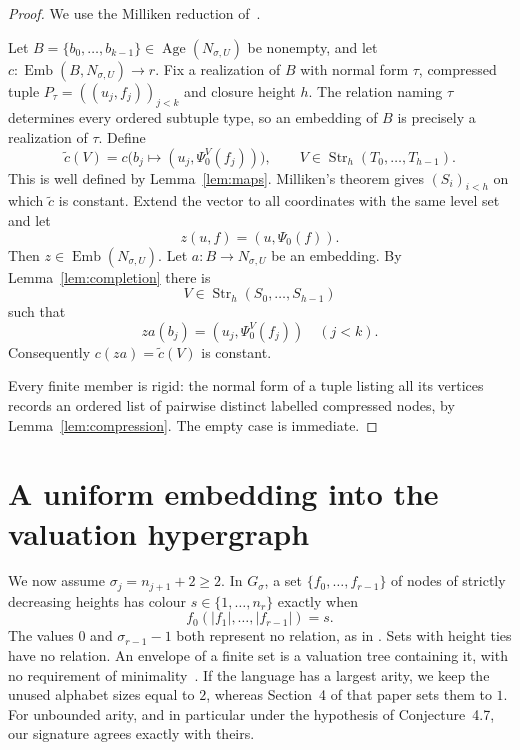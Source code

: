 \documentclass{article}
\numberwithin{equation}{section}
\theoremstyle{definition}
\DeclareMathOperator{\Emb}{Emb}
\DeclareMathOperator{\Age}{Age}
\DeclareMathOperator{\Str}{Str}
\begin{document}
\begin{proof}
We use the Milliken reduction of~\cite[proof of Proposition~4.1]{InfiniteLanguages}.

Let $B=\{b_0,\ldots,b_{k-1}\}\in\Age(N_{\sigma,U})$ be nonempty, and let
$c:\Emb(B,N_{\sigma,U})\to r$. Fix a realization of $B$ with normal form
$\tau$, compressed tuple $P_\tau=((u_j,f_j))_{j<k}$ and closure height $h$.
The relation naming $\tau$ determines every ordered subtuple type, so an
embedding of $B$ is precisely a realization of $\tau$. Define
\[
 \widetilde c(V)=c\bigl(b_j\mapsto(u_j,\Psi_0^V(f_j))\bigr),
 \qquad V\in\Str_h(T_0,\ldots,T_{h-1}).
\]
This is well defined by Lemma~\ref{lem:maps}.
Milliken's theorem gives $(S_i)_{i<h}$ on which $\widetilde c$ is constant.
Extend the vector to all coordinates with the same level set and let
\[
 z(u,f)=(u,\Psi_0(f)).
\]
Then $z\in\Emb(N_{\sigma,U})$. Let $a:B\to N_{\sigma,U}$ be an embedding.
By Lemma~\ref{lem:completion} there is
\[
 V\in\Str_h(S_0,\ldots,S_{h-1})
\]
such that
\[
 za(b_j)=(u_j,\Psi_0^V(f_j))\quad(j<k).
\]
Consequently $c(za)=\widetilde c(V)$ is constant.

Every finite member is rigid: the normal form of a tuple listing all its
vertices records an ordered list of pairwise distinct labelled compressed
nodes, by Lemma~\ref{lem:compression}. The empty case is immediate.
\end{proof}

\section{A uniform embedding into the valuation hypergraph}\label{sec:envelopes}

We now assume $\sigma_j=n_{j+1}+2\geq2$. In $G_\sigma$, a set
$\{f_0,\ldots,f_{r-1}\}$ of nodes of strictly decreasing heights has colour
$s\in\{1,\ldots,n_r\}$ exactly when
\[
f_0(|f_1|,\ldots,|f_{r-1}|)=s.
\]
The values $0$ and $\sigma_{r-1}-1$ both represent no relation, as in
\cite[Definition~3.1]{InfiniteLanguages}. Sets with height ties have no
relation. An envelope of a finite set is a valuation tree containing it,
with no requirement of minimality~\cite[Definition~4.3]{InfiniteLanguages}.
If the language has a largest arity, we keep the unused alphabet sizes
equal to $2$, whereas Section~4 of that paper sets them to $1$.
For unbounded arity, and in particular under the hypothesis of
Conjecture~4.7, our signature agrees exactly with theirs.
\end{document}

